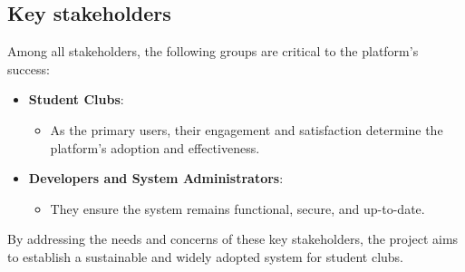 \subsection{Key stakeholders}
Among all stakeholders, the following groups are critical to the
platform's success:

\begin{itemize}
\item
  \textbf{Student Clubs}:

  \begin{itemize}
  \item
    As the primary users, their engagement and satisfaction determine
    the platform's adoption and effectiveness.
  \end{itemize}
\item
  \textbf{Developers and System Administrators}:

  \begin{itemize}
  \item
    They ensure the system remains functional, secure, and up-to-date.
  \end{itemize}
\end{itemize}

By addressing the needs and concerns of these key stakeholders, the
project aims to establish a sustainable and widely adopted system for
student clubs.